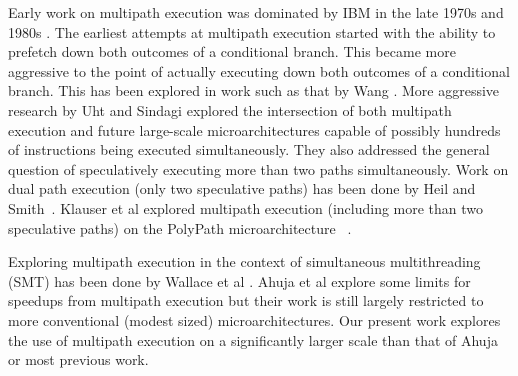Early work on multipath execution was
dominated by IBM in the
late 1970s and 1980s \cite{Conners79}.
The earliest attempts at multipath
execution started with the ability to prefetch down both
outcomes of a conditional branch.  This became more aggressive
to the point of actually executing down both outcomes of
a conditional branch.  This has
been explored in work such as that by
Wang \cite{Wang90}.  
More aggressive research by Uht and
Sindagi \cite{Uht95} explored the intersection of both
multipath execution and future large-scale microarchitectures
capable of possibly hundreds of instructions being executed simultaneously.
They also addressed the general question of speculatively executing
more than two paths simultaneously.
Work on dual path execution (only two speculative paths) has
been done by Heil and Smith~\cite{Heil96}.
Klauser et al 
explored multipath execution (including more than two
speculative paths)
on the PolyPath microarchitecture ~\cite{Klauser98}.

Exploring multipath execution in the context of
simultaneous multithreading (SMT)
has been done by
Wallace et al \cite{Wallace98}.  
Ahuja et al \cite{Ahuja98} explore some limits for speedups from
multipath execution but their work is still largely restricted to more
conventional (modest sized) microarchitectures.
Our present work explores the use
of multipath execution on a significantly larger scale
than that of Ahuja or most previous work.
%

